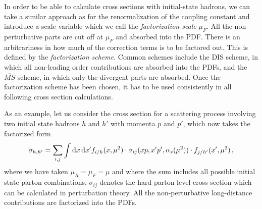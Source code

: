In order to be able to calculate cross sections with initial-state hadrons, we can take a similar approach as for the renormalization of the coupling constant and introduce a scale variable which we call the \textit{factorization scale} $\mu_F$.
All the non-perturbative parts are cut off at $\mu_F$ and absorbed into the PDF.
There is an arbitrariness in how much of the correction terms is to be factored out.
This is defined by the \textit{factorization scheme}.
Common schemes include the DIS scheme, in which all non-leading order contributions are absorbed into the PDFs, and the $\overline{MS}$ scheme, in which only the divergent parts are absorbed.
Once the factorization scheme has been chosen, it has to be used consistently in all following cross section calculations.

As an example, let us consider the cross section for a scattering process involving two initial state hadrons $h$ and $h'$ with momenta $p$ and $p'$, which now takes the factorized form
%
\begin{equation}
	\sigma_{h,h'} = \sum_{i,j} \int \dif x \dif x' f_{i/h}(x,\mu^2) \cdot \sigma_{ij}(x p,x' p',\alpha_s(\mu^2)) \cdot f_{j/h'}(x',\mu^2) \, ,
	\label{eq:hadron_crosssection}
\end{equation}
%
where we have taken $\mu_R = \mu_F= \mu$ and where the sum includes all possible initial state parton combinations.
$\sigma_{ij}$ denotes the hard parton-level cross section which can be calculated in perturbation theory.
All the non-perturbative long-distance contributions are factorized into the PDFs.
%

